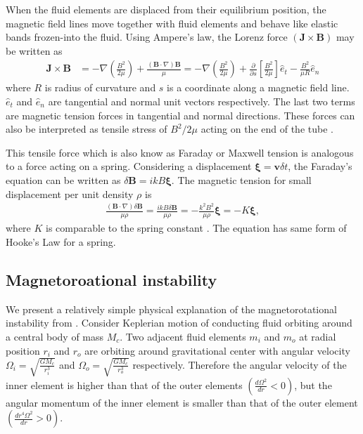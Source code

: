 \documentclass{jfm}
\newcommand{\del}{\nabla}
\begin{document}
When the fluid elements are displaced from their equilibrium position, the 
magnetic field lines move together with fluid elements and behave like elastic
bands frozen-into the fluid. Using Ampere's law, the Lorenz force 
$(\mathbf{J}\times\mathbf{B})$ may be written as
\begin{align}
    \mathbf{J}\times\mathbf{B} &= - \del\left(\frac{B^2}{2\mu}\right) +\frac{(\mathbf{B}\cdot \del)\mathbf{B}}{\mu}
    =- \del\left(\frac{B^2}{2\mu}\right)+\frac{\partial}{\partial s} \left[\frac{B^2}{2\mu}\right]\hat{e}_t - \frac{B^2}{\mu R}\hat{e}_n
\end{align} 
where $R$ is radius of curvature and $s$ is a coordinate along a magnetic 
field line. $\hat{e}_t$ and $\hat{e}_n$ are tangential and normal unit vectors 
respectively. The last two terms are magnetic tension forces in tangential and 
normal directions. These forces can also be interpreted as tensile stress of 
$B^2/2\mu$ acting on the end of the tube \cite[see][]{Davidson2001}. 

This tensile force which is also know as Faraday or Maxwell tension is 
analogous to a force acting on a spring. Considering a displacement 
$\boldsymbol{\xi}=\mathbf{v}\delta t$, the Faraday's equation can be written 
as $\delta \mathbf{B} = ikB\boldsymbol{\xi}$. The magnetic tension for small 
displacement per unit density $\rho$ is
\begin{align}
    \frac{(\mathbf{B}\cdot\del)\delta \mathbf{B}}{\mu \rho}=\frac{ikB\delta \mathbf{B}}{\mu \rho} = -\frac{k^2 B^2}{\mu\rho} \boldsymbol{\xi} = -K \boldsymbol{\xi},
\end{align}
where $K$ is comparable to the spring constant \cite[see][]{Wiki:MRI,Balbus1998}. The 
equation has same form of Hooke's Law for a spring.


%
%
\subsection{Magnetoroational instability}
We present a relatively simple physical explanation of the magnetorotational instability from \cite{Balbus2011}. Consider Keplerian motion of conducting fluid orbiting around a central body of mass $M_c$.
Two adjacent fluid elements $m_i$ and $m_o$ at radial position $r_i$ and $r_o$ are orbiting around gravitational center with angular velocity $\Omega_i=\sqrt{\frac{GM_c}{r_i^{3}}}$ and $\Omega_o=\sqrt{\frac{GM_c}{r_o^{3}}}$ respectively. Therefore the angular velocity of the inner element is higher than that of the outer elements $\left(\frac{d \Omega^2}{dr}<0\right)$, but the angular momentum of the inner element is smaller than that of the outer element $\left(\frac{d r^4\Omega^2}{dr}>0\right)$.
\end{document}

